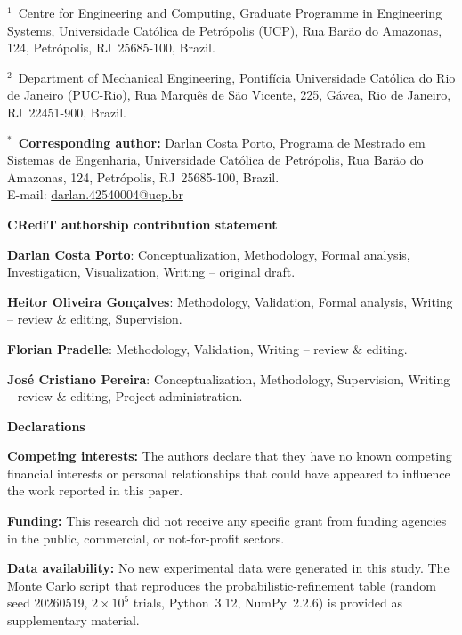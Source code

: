 \documentclass[11pt,a4paper]{article}
\begin{document}
\noindent$^{1}$~Centre for Engineering and Computing, Graduate
Programme in Engineering Systems, Universidade Cat\'olica de
Petr\'opolis (UCP), Rua Bar\~ao do Amazonas, 124, Petr\'opolis,
RJ~25685-100, Brazil.

\medskip

\noindent$^{2}$~Department of Mechanical Engineering, Pontif\'icia
Universidade Cat\'olica do Rio de Janeiro (PUC-Rio), Rua Marqu\^es
de S\~ao Vicente, 225, G\'avea, Rio de Janeiro, RJ~22451-900, Brazil.

\bigskip\bigskip

\noindent$^{*}$~\textbf{Corresponding author:} Darlan Costa Porto,
Programa de Mestrado em Sistemas de Engenharia, Universidade
Cat\'olica de Petr\'opolis, Rua Bar\~ao do Amazonas, 124, Petr\'opolis,
RJ~25685-100, Brazil.\\
E-mail: \href{mailto:darlan.42540004@ucp.br}{darlan.42540004@ucp.br}

\bigskip\bigskip

\noindent\textbf{CRediT authorship contribution statement}

\medskip

\noindent\textbf{Darlan Costa Porto}: Conceptualization, Methodology,
Formal analysis, Investigation, Visualization, Writing -- original
draft.

\noindent\textbf{Heitor Oliveira Gon\c{c}alves}: Methodology,
Validation, Formal analysis, Writing -- review \& editing, Supervision.

\noindent\textbf{Florian Pradelle}: Methodology, Validation,
Writing -- review \& editing.

\noindent\textbf{Jos\'e Cristiano Pereira}: Conceptualization,
Methodology, Supervision, Writing -- review \& editing, Project
administration.

\bigskip\bigskip

\noindent\textbf{Declarations}

\medskip

\noindent\textbf{Competing interests:} The authors declare that they
have no known competing financial interests or personal relationships
that could have appeared to influence the work reported in this paper.

\medskip

\noindent\textbf{Funding:} This research did not receive any specific
grant from funding agencies in the public, commercial, or
not-for-profit sectors.

\medskip

\noindent\textbf{Data availability:} No new experimental data were
generated in this study. The Monte Carlo script that reproduces the
probabilistic-refinement table (random seed 20260519, $2\times 10^{5}$
trials, Python~3.12, NumPy~2.2.6) is provided as supplementary
material.
\end{document}
